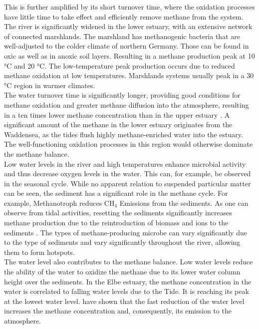 This is further amplified by its short turnover time, where the oxidation processes have little time to take effect and efficiently remove methane from the system.\\
The river is significantly widened in the lower estuary, with an extensive network of connected marshlands. The marshland has methanogenic bacteria that are well-adjusted to the colder climate of northern Germany. Those can be found in oxic as well as in anoxic soil layers. Resulting in a methane production peak at 10 °C and 20 °C. \cite{Wagner.1997} The low-temperature peak production occurs due to reduced methane oxidation at low temperatures. Marshlands systems usually peak in a 30 °C region in warmer climates. \\
The water turnover time is significantly longer, providing good conditions for methane oxidation and greater methane diffusion into the atmosphere, resulting in a ten times lower methane concentration than in the upper estuary \cite{Matousu.2019}. A significant amount of the methane in the lower estuary originates from the Waddensea, as the tides flush highly methane-enriched water into the estuary. The well-functioning oxidation processes in this region would otherwise dominate the methane balance.\\
Low water levels in the river and high temperatures enhance microbial activity and thus decrease oxygen levels in the water. This can, for example, be observed in the seasonal cycle. While no apparent relation to suspended particular matter can be seen, the sediment has a significant role in the methane cycle. For example, Methanotroph reduces CH$_4$ Emissions from the sediments.  As one can observe from tidal activities, resetting the sediments significantly increases methane production due to the reintroduction of biomass and ions to the sediments \cite{Bednarik.2019}. The types of methane-producing microbe can vary significantly due to the type of sediments and vary significantly throughout the river, allowing them to form hotspots.\\
The water level also contributes to the methane balance. Low water levels reduce the ability of the water to oxidize the methane due to its lower water column height over the sediments. In the Elbe estuary, the methane concentration in the water is correlated to falling water levels due to the Tide. It is reaching its peak at the lowest water level. \cite{Harrison.2017} have shown that the fast reduction of the water level increases the methane concentration and, consequently, its emission to the atmosphere. \\
